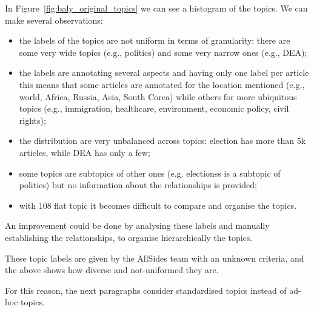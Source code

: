 In Figure~\ref{fig:baly_original_topics} we can see a histogram of the topics. We can make several observations:

\begin{itemize}
    \item the labels of the topics are not uniform in terms of granularity: there are some very wide topics (e.g., politics) and some very narrow ones (e.g., DEA);
    \item the labels are annotating several aspects and having only one label per article this means that some articles are annotated for the location mentioned (e.g., world, Africa, Russia, Asia, South Corea) while others for more ubiquitous topics (e.g., immigration, healthcare, environment, economic policy, civil rights); %
    \item the distribution are very unbalanced across topics: election has more than 5k articles, while DEA has only a few;
    \item some topics are subtopics of other ones (e.g. electionss is a subtopic of politics) but no information about the relationships is provided;
    \item with 108 flat topic it becomes difficult to compare and organise the topics.
\end{itemize}

An improvement could be done by analysing these labels and manually establishing the relationships, to organise hierarchically the topics.




These topic labels are given by the AllSides team with an unknown criteria, and the above shows how diverse and not-uniformed they are.

For this reason, the next paragraphs consider standardised topics instead of ad-hoc topics.


